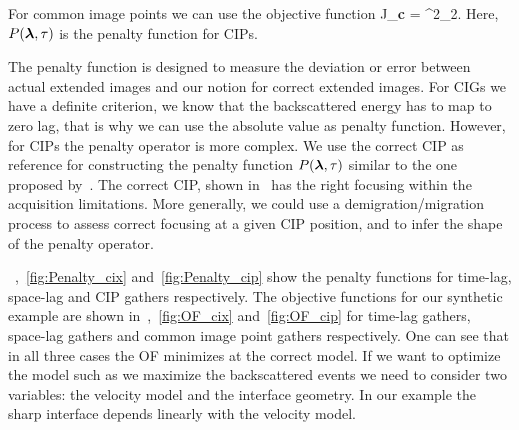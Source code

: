 For common image points we can use the objective function
\beq
J_{\bf c} =   ^2_2.
\eeq
%
Here, $P({\boldsymbol{\lambda}},\tau)$ is the penalty function for CIPs.

The penalty function is designed to measure the deviation or error between actual extended images and our notion for correct 
extended images. For CIGs we have a definite criterion, we know that the backscattered energy has to map
to zero lag, that is why we can use the absolute value as penalty function. However, for CIPs the 
penalty operator is more complex. We use the correct CIP as reference for constructing the penalty function $P({\boldsymbol{\lambda}},\tau)$ similar
to the one proposed by~\citep{tony:cwp12}. The correct CIP, shown in~ has the right focusing within the acquisition limitations.
More generally, we could use a demigration/migration process to assess correct focusing at a given CIP position, and to infer the shape of 
the penalty operator.

~,~\ref{fig:Penalty_cix} and~\ref{fig:Penalty_cip} show the penalty functions for time-lag, space-lag and CIP gathers respectively.
The objective functions for our synthetic example are shown in~,~\ref{fig:OF_cix} and~\ref{fig:OF_cip} for time-lag gathers, space-lag gathers and
common image point gathers respectively. One can see that in all three cases the OF minimizes at the correct model. If we want to optimize the model such as 
we maximize the backscattered events we need to consider two variables: the velocity model and the interface geometry. 
 In our example the sharp interface depends linearly with the velocity model.






